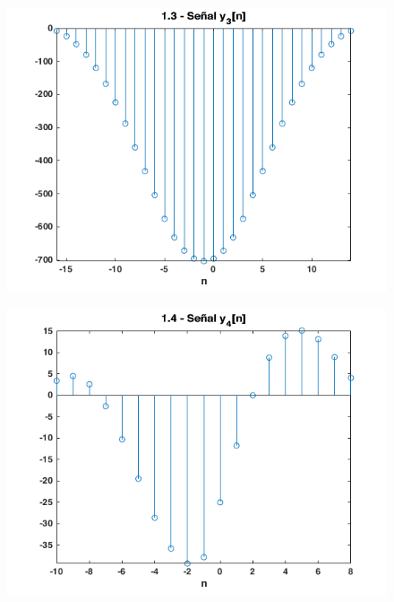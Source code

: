 \documentclass{article}
\begin{document}
\begin{figure} \caption[Figura 6]{}
	\centering
	\includegraphics[width=\linewidth]{./Figures/06.png}
\end{figure}

\begin{figure} \caption[Figura 7]{}
	\centering
	\includegraphics[width=\linewidth]{./Figures/07.png}
\end{figure}
\end{document}
